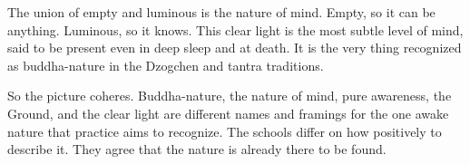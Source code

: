 The union of empty and luminous is the nature of mind. Empty, so it can be anything. Luminous, so it knows. This clear light is the most subtle level of mind, said to be present even in deep sleep and at death. It is the very thing recognized as buddha-nature in the Dzogchen and tantra traditions.

So the picture coheres. Buddha-nature, the nature of mind, pure awareness, the Ground, and the clear light are different names and framings for the one awake nature that practice aims to recognize. The schools differ on how positively to describe it. They agree that the nature is already there to be found.
